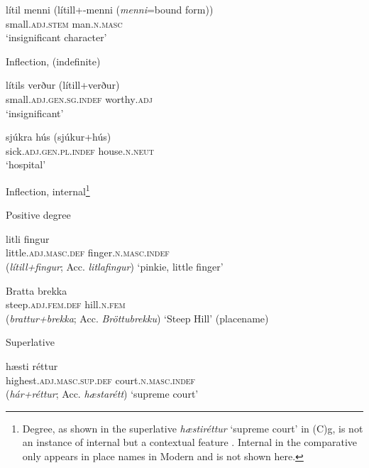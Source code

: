 \documentclass[output=paper]{LSP/langsci}
\begin{document}
\begin{xlist}
\begin{xlist}
\begin{xlist}
	\gll lítil menni (lítill+-menni (\textit{menni}=bound form)) \\
	 small\textsc{.adj.stem} man\textsc{.n.masc}\\
	\glt ‘insignificant character’
\end{xlist}
 Inflection,  (indefinite)
\begin{xlist}
	\gll lítils verður (lítill+verður) \\
	 small\textsc{.adj.gen.sg.indef} worthy\textsc{.adj}\\
	\glt ‘insignificant’

	\gll sjúkra hús (sjúkur+hús) \\
	 sick\textsc{.adj.gen.pl.indef} house\textsc{.n.neut}\\
	\glt ‘hospital’
\end{xlist}
 Inflection, internal\footnote{Degree, as shown in the superlative \textit{hæstiréttur} ‘supreme court’ in  (C)g, is not an instance of internal  but a contextual feature \citep[21]{Indriðason2014}. Internal  in the comparative only appears in place names in Modern  and is not shown here.}
\begin{xlist}
 Positive degree
\begin{xlist}
	\gll litli fingur  \\
	 little\textsc{.adj.masc.def} finger\textsc{.n.masc.indef}\\
	 
	 (\textit{lítill+fingur}; Acc. \textit{litlafingur})
	\glt ‘pinkie, little finger’

	\gll Bratta brekka  \\
	 steep\textsc{.adj.fem.def} hill\textsc{.n.fem}\\
	 
	 (\textit{brattur+brekka}; Acc. \textit{Bröttubrekku}) 
	\glt ‘Steep Hill’ (placename)
\end{xlist}
  Superlative 
\begin{xlist}
	\gll hæsti réttur  \\
	 highest\textsc{.adj.masc.sup.def} court\textsc{.n.masc.indef}\\
	 
	 (\textit{hár+réttur}; Acc. \textit{hæstarétt}) 
	\glt ‘supreme court’ 
\end{xlist}
\end{xlist}
\end{xlist}
\z


\end{xlist}
\end{document}
